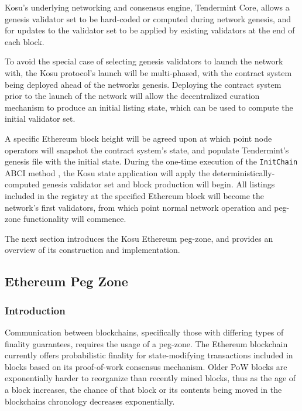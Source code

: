 \documentclass[10pt]{article}
\begin{document}
Kosu’s underlying networking and consensus engine, Tendermint Core, allows a genesis validator set to be hard-coded or computed during network genesis, and for updates to the validator set to be applied by existing validators at the end of each block\cite{tendermint-abci-apps}.
\medskip

To avoid the special case of selecting genesis validators to launch the network with, the Kosu protocol’s launch will be multi-phased, with the contract system being deployed ahead of the networks genesis. Deploying the contract system prior to the launch of the network will allow the decentralized curation mechanism to produce an initial listing state, which can be used to compute the initial validator set. 
\medskip

A specific Ethereum block height will be agreed upon at which point node operators will snapshot the contract system’s state, and populate Tendermint’s genesis file with the initial state. During the one-time execution of the \texttt{InitChain} ABCI method \cite{tendermint-abci-apps}, the Kosu state application will apply the deterministically-computed genesis validator set and block production will begin. All listings included in the registry at the specified Ethereum block will become the network’s first validators, from which point normal network operation and peg-zone functionality will commence.
\medskip

The next section introduces the Kosu Ethereum peg-zone, and provides an overview of its construction and implementation.

\subsection{Ethereum Peg Zone}\label{peg}
\subsubsection{Introduction}\label{peg-intro}
Communication between blockchains, specifically those with differing types of finality guarantees, requires the usage of a peg-zone. The Ethereum blockchain currently offers probabilistic finality for state-modifying transactions included in blocks based on its proof-of-work consensus mechanism. Older PoW blocks are exponentially harder to reorganize than recently mined blocks, thus as the age of a block increases, the chance of that block or its contents being moved in the blockchains chronology decreases exponentially\cite{blockchain-taxonomy}.
\medskip
\end{document}

